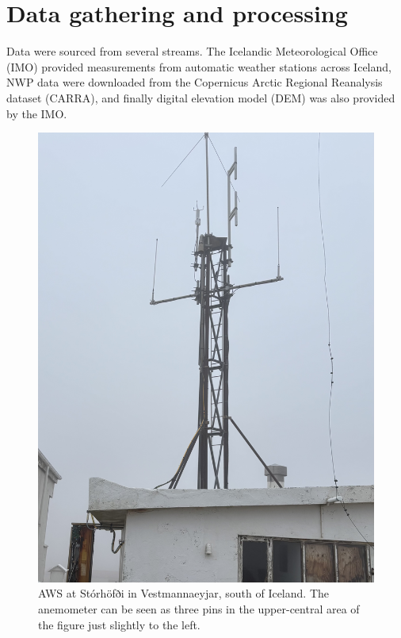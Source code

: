 
\chapter{Data gathering and processing}
\label{Chapter2}
Data were sourced from several streams. The Icelandic Meteorological Office (IMO) provided measurements from automatic weather stations across Iceland, NWP data were downloaded from the Copernicus Arctic Regional Reanalysis dataset (CARRA), and finally digital elevation model (DEM) was also provided by the IMO.

\begin{figure}[H]
  \centering
  \includegraphics[scale=0.3]{Figures/storhofdi.jpeg}
  \caption[AWS at Stórhöfði in Vestmannaeyjar, in south Iceland.]{AWS at Stórhöfði in Vestmannaeyjar, south of Iceland. The anemometer can be seen as three pins in the upper-central area of the figure just slightly to the left.}
  \label{fig:storhofdi}
\end{figure}

